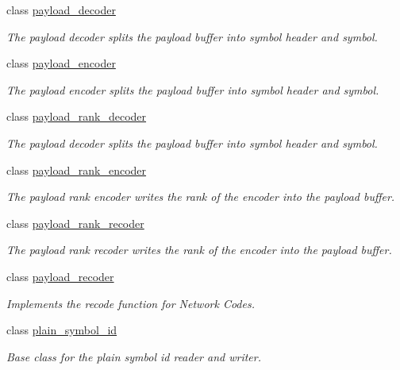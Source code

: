 \begin{DoxyCompactItemize}
class \hyperlink{classkodo_1_1payload__decoder}{payload\-\_\-decoder}
\begin{DoxyCompactList}\small\item\em The payload decoder splits the payload buffer into symbol header and symbol. \end{DoxyCompactList}\item 
class \hyperlink{classkodo_1_1payload__encoder}{payload\-\_\-encoder}
\begin{DoxyCompactList}\small\item\em The payload encoder splits the payload buffer into symbol header and symbol. \end{DoxyCompactList}\item 
class \hyperlink{classkodo_1_1payload__rank__decoder}{payload\-\_\-rank\-\_\-decoder}
\begin{DoxyCompactList}\small\item\em The payload decoder splits the payload buffer into symbol header and symbol. \end{DoxyCompactList}\item 
class \hyperlink{classkodo_1_1payload__rank__encoder}{payload\-\_\-rank\-\_\-encoder}
\begin{DoxyCompactList}\small\item\em The payload rank encoder writes the rank of the encoder into the payload buffer. \end{DoxyCompactList}\item 
class \hyperlink{classkodo_1_1payload__rank__recoder}{payload\-\_\-rank\-\_\-recoder}
\begin{DoxyCompactList}\small\item\em The payload rank recoder writes the rank of the encoder into the payload buffer. \end{DoxyCompactList}\item 
class \hyperlink{classkodo_1_1payload__recoder}{payload\-\_\-recoder}
\begin{DoxyCompactList}\small\item\em Implements the recode function for Network Codes. \end{DoxyCompactList}\item 
class \hyperlink{classkodo_1_1plain__symbol__id}{plain\-\_\-symbol\-\_\-id}
\begin{DoxyCompactList}\small\item\em Base class for the plain symbol id reader and writer. \end{DoxyCompactList}\item 

\end{DoxyCompactItemize}
